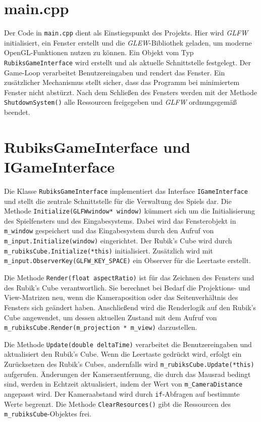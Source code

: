 \section{main.cpp}
Der Code in \texttt{main.cpp} dient als Einstiegspunkt des Projekts. Hier wird \textit{GLFW} initialisiert, ein Fenster erstellt und die \textit{GLEW}-Bibliothek geladen, um moderne OpenGL-Funktionen nutzen zu können. Ein Objekt vom Typ \texttt{RubiksGameInterface} wird erstellt und als aktuelle Schnittstelle festgelegt. Der Game-Loop verarbeitet Benutzereingaben und rendert das Fenster. Ein zusätzlicher Mechanismus stellt sicher, dass das Programm bei minimiertem Fenster nicht abstürzt. Nach dem Schließen des Fensters werden mit der Methode \texttt{ShutdownSystem()} alle Ressourcen freigegeben und \textit{GLFW} ordnungsgemäß beendet.


\section{RubiksGameInterface und IGameInterface}
Die Klasse \texttt{RubiksGameInterface} implementiert das Interface \texttt{IGameInterface} und stellt die zentrale Schnittstelle für die Verwaltung des Spiels dar.
Die Methode \texttt{Initialize(GLFWwindow* window)} kümmert sich um die Initialisierung des Spielfensters und des Eingabesystems. Dabei wird das Fensterobjekt in \texttt{m\_window} gespeichert und das Eingabesystem durch den Aufruf von \texttt{m\_input.Initialize(window)} eingerichtet. Der Rubik's Cube wird durch \texttt{m\_rubiksCube.Initialize(*this)} initialisiert. Zusätzlich wird mit \texttt{m\_input.ObserverKey(GLFW\_KEY\_SPACE)} ein Observer für die Leertaste erstellt.

Die Methode \texttt{Render(float aspectRatio)} ist für das Zeichnen des Fensters und des Rubik's Cube verantwortlich. Sie berechnet bei Bedarf die Projektions- und View-Matrizen neu, wenn die Kameraposition oder das Seitenverhältnis des Fensters sich geändert haben. Anschließend wird die Renderlogik auf den Rubik's Cube angewendet, um dessen aktuellen Zustand mit dem Aufruf von \texttt{m\_rubiksCube.Render(m\_projection * m\_view)} darzustellen.

Die Methode \texttt{Update(double deltaTime)} verarbeitet die Benutzereingaben und aktualisiert den Rubik's Cube. Wenn die Leertaste gedrückt wird, erfolgt ein Zurücksetzen des Rubik's Cubes, andernfalls wird \texttt{m\_rubiksCube.Update(*this)} aufgerufen. Änderungen der Kameraentfernung, die durch das Mausrad bedingt sind, werden in Echtzeit aktualisiert, indem der Wert von \texttt{m\_CameraDistance} angepasst wird. Der Kameraabstand wird durch \texttt{if}-Abfragen auf bestimmte Werte begrenzt. Die Methode \texttt{ClearResources()} gibt die Ressourcen des \texttt{m\_rubiksCube}-Objektes frei.

